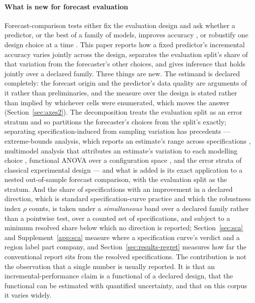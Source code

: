 \documentclass[11pt,3p,review,authoryear]{elsarticle}
\theoremstyle{definition}
\begin{document}
\paragraph{What is new for forecast evaluation}
Forecast-comparison tests either fix the evaluation design and ask whether a
predictor, or the best of a family of models, improves accuracy
\citep{clark2001nested,hansen2005spa,gonzalo2024outofsample}, or robustify
one design choice at a time \citep{rossi2012window,hansen2012sample}. This
paper reports how a fixed predictor's incremental accuracy varies jointly
across the design, separates the evaluation split's share of that variation
from the forecaster's other choices, and gives inference that holds jointly
over a declared family. Three things are
new. The estimand is declared completely: the forecast origin and the
predictor's data quality are arguments of it rather than preliminaries, and
the measure over the design is stated rather than implied by whichever cells
were enumerated, which moves the answer (Section~\ref{sec:axes2}). The
decomposition treats the evaluation split as an error stratum and so
partitions the forecaster's choices from the split's exactly; separating
specification-induced from sampling variation has precedents ---
extreme-bounds analysis, which reports an estimate's range across
specifications \citep{leamer1983con}, multimodel analysis that attributes an
estimate's variation to each modelling choice \citep{young2017model},
functional ANOVA over a configuration space \citep{hutter2014efficient}, and
the error strata of classical experimental design --- and what is added is
its exact application to a nested out-of-sample forecast comparison, with
the evaluation split as the stratum. And the share of specifications with an
improvement in a declared direction, which is standard specification-curve
practice \citep{simonsohn2020specification} and which the robustness index
$\rho$ counts, is taken under a \emph{simultaneous} band over a declared
family rather than a pointwise test, over a counted set of specifications,
and subject to a minimum resolved share below which no direction is reported;
Section~\ref{sec:sca} and Supplement~\ref{app:sca} measure where a
specification curve's verdict and a region label part company, and
Section~\ref{sec:results-regret} measures how far the conventional report
sits from the resolved specifications. The contribution is not the
observation that a single number is usually reported. It is that an
incremental-performance claim is a functional of a declared design, that the
functional can be estimated with quantified uncertainty, and that on this
corpus it varies widely.
\end{document}
